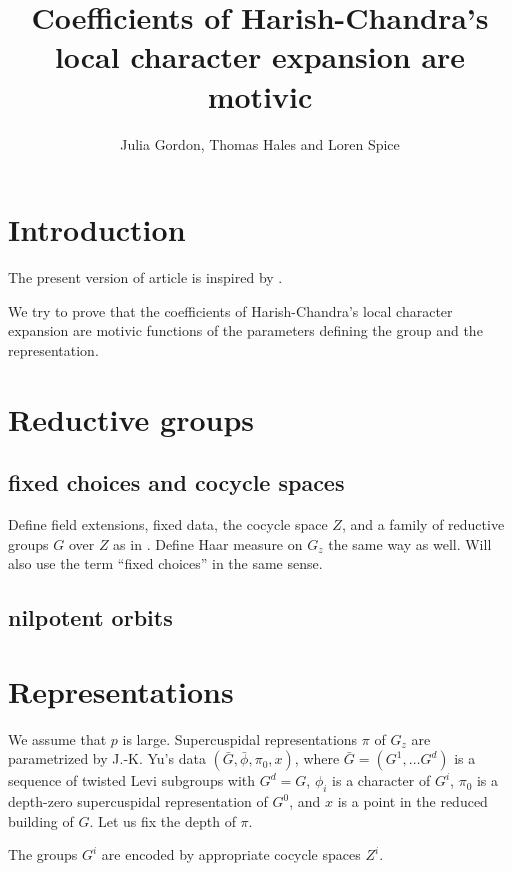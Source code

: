 \documentclass[12pt]{amsart}
\title{Coefficients of Harish-Chandra's local character expansion are motivic}
\author{Julia Gordon, Thomas Hales and Loren Spice}
\theoremstyle{plain}
\theoremstyle{definition}
\begin{document}

\maketitle

\section{Introduction}
The present version of article is inspired by \cite{unsuccessful self-treatment of writer's block}. 
 
We try to prove that the coefficients of Harish-Chandra's local character expansion are motivic functions of the parameters defining the group and the representation. 

\section{Reductive groups}
\subsection{fixed choices and cocycle spaces}
Define field extensions, fixed data, the cocycle space $Z$, and a family of reductive groups $G$ over $Z$ as in \cite{transfer transfer}. Define Haar measure on $G_z$ the same way as well.
Will also use the term ``fixed choices'' in the same sense. 

\subsection{nilpotent orbits}


\section{Representations}
We assume that $p$ is large. 
Supercuspidal representations $\pi$ of $G_z$ are parametrized by J.-K. Yu's data 
$(\bar G, \bar\phi, \pi_0, x)$, where $\bar G=(G^1, \dots G^d)$ is a sequence of twisted Levi subgroups with $G^d=G$, $\phi_i$ is a character of $G^i$, $\pi_0$ is a depth-zero supercuspidal representation of $G^0$, and $x$ is a point in the reduced building of $G$.
Let us fix the depth of $\pi$. 

The groups $G^i$ are encoded by appropriate  cocycle spaces $Z^i$.
\end{document}
